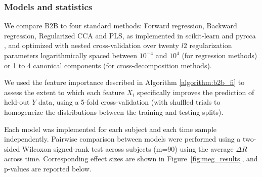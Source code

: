\subsubsection{Models and statistics}

We compare B2B to four standard methods: Forward regression, Backward
regression, Regularized CCA and PLS, as implemented in scikit-learn
\citep{sklearn} and pyrcca \citep{bilenko2016pyrcca}, and optimized with nested cross-validation over twenty $l2$
regularization parameters logarithmically spaced between $10^{-4}$ and $10^4$
(for regression methods) or 1 to 4 canonical components (for cross-decomposition
methods).

We used the feature importance described in Algorithm \ref{algorithm:b2b_fi} to assess the extent to which each feature $X_i$ specifically improves the prediction of held-out $Y$ data, using a 5-fold cross-validation (with shuffled trials to homogeneize the distributions between the training and testing splits).

Each model was implemented for each subject and each time sample independently.
Pairwise comparison between models were performed using a two-sided Wilcoxon
signed-rank test across subjects (m=90) using the average $\Delta R$ across time.
Corresponding effect sizes are shown in Figure~\ref{fig:meg_results}, and
p-values are reported below.


